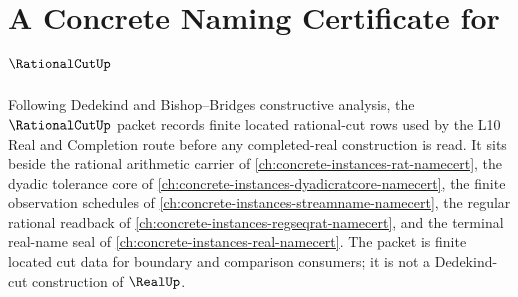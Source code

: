 \chapter{A Concrete Naming Certificate for $\RationalCutUp$}
\label{ch:concrete-instances-rational-cut-namecert}

Following Dedekind and Bishop--Bridges constructive analysis, the $\RationalCutUp$ packet records finite located rational-cut rows used by the L10 Real and Completion route before any completed-real construction is read. It sits beside the rational arithmetic carrier of \autoref{ch:concrete-instances-rat-namecert}, the dyadic tolerance core of \autoref{ch:concrete-instances-dyadicratcore-namecert}, the finite observation schedules of \autoref{ch:concrete-instances-streamname-namecert}, the regular rational readback of \autoref{ch:concrete-instances-regseqrat-namecert}, and the terminal real-name seal of \autoref{ch:concrete-instances-real-namecert}. The packet is finite located cut data for boundary and comparison consumers; it is not a Dedekind-cut construction of $\RealUp$.

